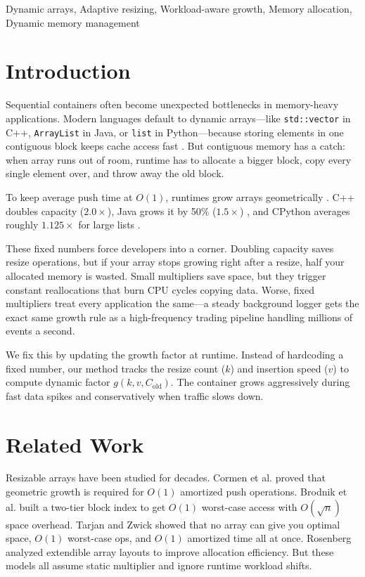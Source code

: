 \documentclass[conference]{IEEEtran}
\begin{document}
\begin{IEEEkeywords}
Dynamic arrays, Adaptive resizing, Workload-aware growth, Memory allocation, Dynamic memory management
\end{IEEEkeywords}

\section{Introduction}
Sequential containers often become unexpected bottlenecks in memory-heavy applications. Modern languages default to dynamic arrays—like \texttt{std::vector} in C++, \texttt{ArrayList} in Java, or \texttt{list} in Python—because storing elements in one contiguous block keeps cache access fast \cite{cormen_algorithms}. But contiguous memory has a catch: when array runs out of room, runtime has to allocate a bigger block, copy every single element over, and throw away the old block.

To keep average push time at $O(1)$, runtimes grow arrays geometrically \cite{optimal_resizable}. C++ doubles capacity ($2.0\times$), Java grows it by 50\% ($1.5\times$) \cite{java_data_structures}, and CPython averages roughly $1.125\times$ for large lists \cite{python_list_impl}.

These fixed numbers force developers into a corner. Doubling capacity saves resize operations, but if your array stops growing right after a resize, half your allocated memory is wasted. Small multipliers save space, but they trigger constant reallocations that burn CPU cycles copying data. Worse, fixed multipliers treat every application the same—a steady background logger gets the exact same growth rule as a high-frequency trading pipeline handling millions of events a second.

We fix this by updating the growth factor at runtime. Instead of hardcoding a fixed number, our method tracks the resize count ($k$) and insertion speed ($v$) to compute dynamic factor $g(k,v,C_{\text{old}})$. The container grows aggressively during fast data spikes and conservatively when traffic slows down.

\section{Related Work}
Resizable arrays have been studied for decades. Cormen et al. \cite{cormen_algorithms} proved that geometric growth is required for $O(1)$ amortized push operations. Brodnik et al. \cite{optimal_resizable} built a two-tier block index to get $O(1)$ worst-case access with $O(\sqrt{n})$ space overhead. Tarjan and Zwick \cite{time_space_complexity} showed that no array can give you optimal space, $O(1)$ worst-case ops, and $O(1)$ amortized time all at once. Rosenberg \cite{allocating_storage, managing_storage} analyzed extendible array layouts to improve allocation efficiency. But these models all assume static multiplier and ignore runtime workload shifts.
\end{document}
